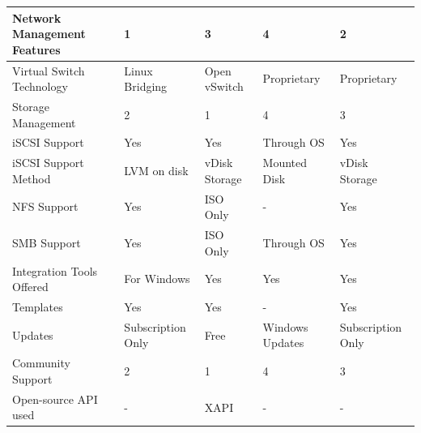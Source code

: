 \documentclass[12pt]{spieman}  %
\begin{document}
\begin{landscape}
\begin{table}
\begin{tabular}{|l|l|l|l|l|}
\rule[-1ex]{0pt}{3.5ex} Network Management Features                                      & 1                 & 3             & 4                   & 2                 \\ \hline
\rule[-1ex]{0pt}{3.5ex} Virtual Switch Technology                                        & Linux Bridging    & Open vSwitch  & Proprietary         & Proprietary       \\ \hline
\rule[-1ex]{0pt}{3.5ex} Storage Management                                               & 2                 & 1             & 4                   & 3                 \\ \hline
\rule[-1ex]{0pt}{3.5ex} iSCSI Support                                                    & Yes               & Yes           & Through OS          & Yes               \\ \hline
\rule[-1ex]{0pt}{3.5ex} iSCSI Support Method                                             & LVM on disk       & vDisk Storage & Mounted Disk        & vDisk Storage     \\ \hline
\rule[-1ex]{0pt}{3.5ex} NFS Support                                                      & Yes               & ISO Only      & -                   & Yes               \\ \hline
\rule[-1ex]{0pt}{3.5ex} SMB Support                                                      & Yes               & ISO Only      & Through OS          & Yes               \\ \hline
\rule[-1ex]{0pt}{3.5ex} Integration Tools Offered                                        & For Windows       & Yes           & Yes                 & Yes               \\ \hline
\rule[-1ex]{0pt}{3.5ex} Templates                                                        & Yes               & Yes           & -                   & Yes               \\ \hline
\rule[-1ex]{0pt}{3.5ex} Updates                                                          & Subscription Only & Free          & Windows Updates     & Subscription Only \\ \hline
\rule[-1ex]{0pt}{3.5ex} Community Support                                                & 2                 & 1             & 4                   & 3                 \\ \hline
\rule[-1ex]{0pt}{3.5ex} Open-source API used                                             & -                 & XAPI          & -                   & -                 \\ \hline

\end{tabular}
\end{table}
\end{landscape}
\end{document}
